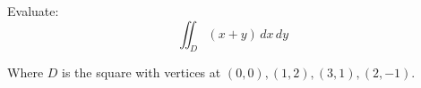 Evaluate: 
    \[
        \iint_D (x+y) \, dx \, dy
    \]
    
Where $D$ is the square with vertices at $(0,0),(1,2),(3,1),(2,-1)$.
